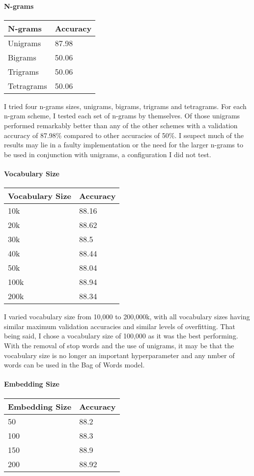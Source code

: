 \documentclass[11pt]{article}
\begin{document}
    \paragraph{N-grams}\label{n-grams}

\begin{longtable}[]{@{}ll@{}}
\toprule
N-grams & Accuracy\tabularnewline
\midrule
\endhead
Unigrams & 87.98\tabularnewline
Bigrams & 50.06\tabularnewline
Trigrams & 50.06\tabularnewline
Tetragrams & 50.06\tabularnewline
\bottomrule
\end{longtable}

I tried four n-grams sizes, unigrams, bigrams, trigrams and tetragrams.
For each n-gram scheme, I tested each set of n-grams by themselves. Of
those unigrams performed remarkably better than any of the other schemes
with a validation accuracy of 87.98\% compared to other accuracies of
50\%. I ssupect much of the results may lie in a faulty implementation
or the need for the larger n-grams to be used in conjunction with
unigrams, a configuration I did not test.

    \paragraph{Vocabulary Size}\label{vocabulary-size}

\begin{longtable}[]{@{}ll@{}}
\toprule
Vocabulary Size & Accuracy\tabularnewline
\midrule
\endhead
10k & 88.16\tabularnewline
20k & 88.62\tabularnewline
30k & 88.5\tabularnewline
40k & 88.44\tabularnewline
50k & 88.04\tabularnewline
100k & 88.94\tabularnewline
200k & 88.34\tabularnewline
\bottomrule
\end{longtable}

I varied vocabulary size from 10,000 to 200,000k, with all vocabulary
sizes having similar maximum validation accuracies and similar levels of
overfitting. That being said, I chose a vocabulary size of 100,000 as it
was the best performing. With the removal of stop words and the use of
unigrams, it may be that the vocabulary size is no longer an important
hyperparameter and any nmber of words can be used in the Bag of Words
model.

    \paragraph{Embedding Size}\label{embedding-size}

\begin{longtable}[]{@{}ll@{}}
\toprule
Embedding Size & Accuracy\tabularnewline
\midrule
\endhead
50 & 88.2\tabularnewline
100 & 88.3\tabularnewline
150 & 88.9\tabularnewline
200 & 88.92\tabularnewline
\bottomrule
\end{longtable}
\end{document}
